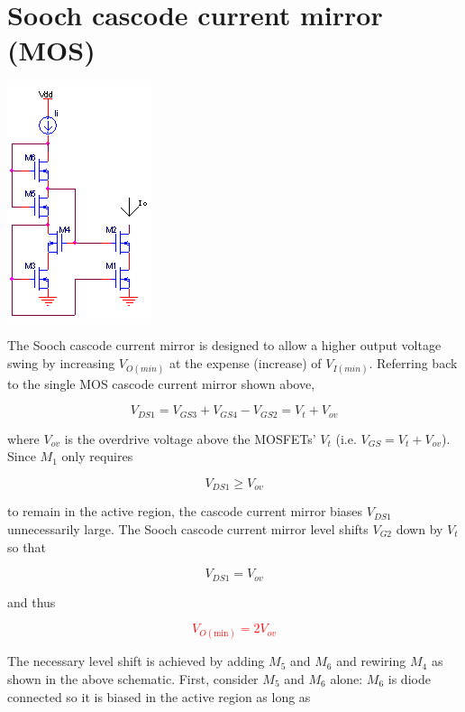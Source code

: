\section{Sooch cascode current mirror (MOS)}
\begin{center}
	\includegraphics{schematics/soochcascodecurrentmirror.PNG}
\end{center}
The Sooch cascode current mirror is designed to allow a higher output voltage swing by increasing $V_{O(min)}$ at the expense (increase) of $V_{I(min)}$. Referring back to the single MOS cascode current mirror shown above,

\begin{equation}
V_{DS1} = V_{GS3} + V_{GS4} - V_{GS2} = V_{t} + V_{ov}
\end{equation}

where $V_{ov}$ is the overdrive voltage above the MOSFETs' $V_{t}$ (i.e. $V_{GS} = V_{t} + V_{ov}$). Since $M_{1}$ only requires

\begin{equation}
V_{DS1} \geq V_{ov}
\end{equation}

to remain in the active region, the cascode current mirror biases $V_{DS1}$ unnecessarily large. The Sooch cascode current mirror level shifts $V_{G2}$ down by $V_{t}$ so that

\begin{equation}
V_{DS1} = V_{ov}
\end{equation}

and thus

\textcolor{red}{
\begin{equation}
V_{O(\text{min})} = 2V_{ov}
\end{equation}
}

\par The necessary level shift is achieved by adding $M_{5}$ and $M_{6}$ and rewiring $M_{4}$ as shown in the above schematic. First, consider $M_{5}$ and $M_{6}$ alone: $M_{6}$ is diode connected so it is biased in the active region as long as


